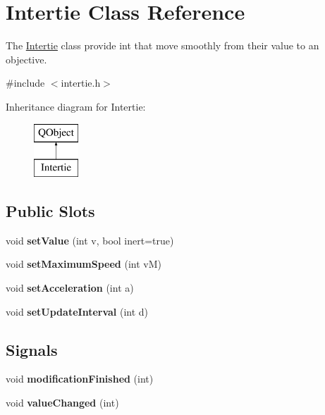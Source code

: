 \hypertarget{class_intertie}{}\section{Intertie Class Reference}
\label{class_intertie}


The \hyperlink{class_intertie}{Intertie} class provide int that move smoothly from their value to an objective.  




{\ttfamily \#include $<$intertie.\+h$>$}

Inheritance diagram for Intertie\+:\begin{figure}[H]
\begin{center}
\leavevmode
\includegraphics[height=2.000000cm]{class_intertie}
\end{center}
\end{figure}
\subsection*{Public Slots}
\begin{DoxyCompactItemize}
\item 
\hypertarget{class_intertie_adc4c0f1797d74c01cbe0fed9bc2763ec}{}\label{class_intertie_adc4c0f1797d74c01cbe0fed9bc2763ec} 
void {\bfseries set\+Value} (int v, bool inert=true)
\item 
\hypertarget{class_intertie_abfd23bc0f2d764bd58997c578c2fad79}{}\label{class_intertie_abfd23bc0f2d764bd58997c578c2fad79} 
void {\bfseries set\+Maximum\+Speed} (int vM)
\item 
\hypertarget{class_intertie_a8911421634e9ec99cf762060f68b8d5e}{}\label{class_intertie_a8911421634e9ec99cf762060f68b8d5e} 
void {\bfseries set\+Acceleration} (int a)
\item 
\hypertarget{class_intertie_aae62fc52ccd30f0d4606c611a9b5aea8}{}\label{class_intertie_aae62fc52ccd30f0d4606c611a9b5aea8} 
void {\bfseries set\+Update\+Interval} (int d)
\end{DoxyCompactItemize}
\subsection*{Signals}
\begin{DoxyCompactItemize}
\item 
\hypertarget{class_intertie_a6723ac2faa801421b291b9a2b289aedf}{}\label{class_intertie_a6723ac2faa801421b291b9a2b289aedf} 
void {\bfseries modification\+Finished} (int)
\item 
\hypertarget{class_intertie_ac704099264fb03441f959297513b9f04}{}\label{class_intertie_ac704099264fb03441f959297513b9f04} 
void {\bfseries value\+Changed} (int)
\end{DoxyCompactItemize}
